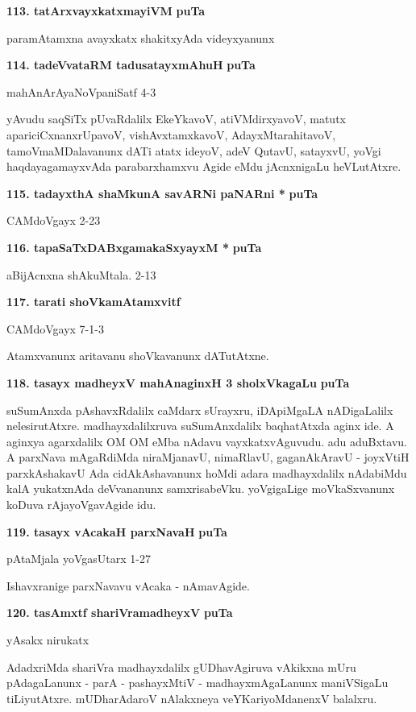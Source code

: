 \medskip
\noindent
\textbf{113. tatArxvayxkatxmayiVM} \hfill{\bf puTa \pageref{86d}}

\smallskip
paramAtamxna avayxkatx shakitxyAda videyxyanunx

\medskip
\noindent
\textbf{114. tadeVvataRM tadusatayxmAhuH} \hfill{\bf puTa \pageref{239c}}

\hfill{mahAnArAyaNoVpaniSatf 4-3}

\smallskip
yAvudu saqSiTx pUvaRdalilx EkeYkavoV, atiVMdirxyavoV, matutx apariciCxnanxrUpavoV, vishAvxtamxkavoV, AdayxMtarahitavoV, tamoVmaMDalavanunx dATi atatx ideyoV, adeV QutavU, satayxvU, yoVgi haqdayagamayxvAda parabarxhamxvu Agide eMdu jAcnxnigaLu heVLutAtxre.


\medskip
\noindent
\textbf{115. tadayxthA shaMkunA savARNi paNARni *} \hfill{\bf puTa \pageref{84}}

\hfill{CAMdoVgayx 2-23}

\medskip
\noindent
\textbf{116. tapaSaTxDABxgamakaSxyayxM *} \hfill{\bf puTa \pageref{46}}

\hfill{aBijAcnxna shAkuMtala. 2-13}

\medskip
\noindent
\textbf{117. tarati shoVkamAtamxvitf} \hfill{\bf \pageref{42d}}

\hfill{CAMdoVgayx 7-1-3}

Atamxvanunx aritavanu shoVkavanunx dATutAtxne.

\medskip
\noindent
\textbf{118. tasayx madheyxV mahAnaginxH 3 sholxVkagaLu} \hfill{\bf puTa \pageref{150d}}

\smallskip
suSumAnxda pAshavxRdalilx caMdarx sUrayxru, iDApiMgaLA nADigaLalilx nelesirutAtxre. madhayxdalilxruva suSumAnxdalilx  baqhatAtxda aginx ide. A aginxya agarxdalilx OM OM eMba nAdavu vayxkatxvAguvudu. adu aduBxtavu. A parxNava mAgaRdiMda niraMjanavU, nimaRlavU, gaganAkAravU - joyxVtiH parxkAshakavU Ada cidAkAshavanunx hoMdi adara madhayxdalilx nAdabiMdu kalA yukatxnAda deVvananunx samxrisabeVku. yoVgigaLige moVkaSxvanunx koDuva rAjayoVgavAgide idu.

\medskip
\noindent
\textbf{119. tasayx vAcakaH parxNavaH} \hfill{\bf puTa \pageref{147}}

\hfill{pAtaMjala yoVgasUtarx 1-27}

Ishavxranige parxNavavu vAcaka - nAmavAgide.

\medskip
\noindent
\textbf{120. tasAmxtf shariVramadheyxV} \hfill{\bf puTa \pageref{153}}

\hfill{yAsakx nirukatx}

\smallskip
AdadxriMda shariVra madhayxdalilx gUDhavAgiruva vAkikxna mUru pAdagaLanunx - parA - pashayxMtiV - madhayxmAgaLanunx maniVSigaLu tiLiyutAtxre. mUDharAdaroV nAlakxneya veYKariyoMdanenxV balalxru.

